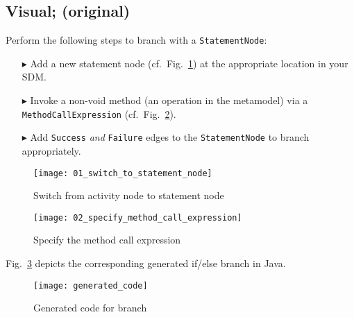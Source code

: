 \clearpage
\hypertarget{conBran vis}{}
\subsection{Visual; (original)}
\visHeader

Perform the following steps to branch with a \texttt{StatementNode}:
\begin{enumerate}
\item[$\blacktriangleright$] Add a new statement node (cf.~Fig.~\ref{fig:cond_statement_node}) at the appropriate location in your SDM.
\item[$\blacktriangleright$] Invoke a non-void method (an operation in the metamodel) via a \texttt{MethodCallExpression} (cf.~Fig.~\ref{fig:cond_method_call}).
\item[$\blacktriangleright$] Add \texttt{Success} \emph{and} \texttt{Failure} edges to the \texttt{StatementNode} to branch appropriately.
\end{enumerate}

\begin{figure}[htp]
\begin{center}
  \texttt{[image: 01\_switch\_to\_statement\_node]}
  \caption{Switch from activity node to statement node}
  \label{fig:cond_statement_node}
\end{center}
\end{figure}

\begin{figure}[htp]
\begin{center}
  \texttt{[image: 02\_specify\_method\_call\_expression]}
  \caption{Specify the method call expression}
  \label{fig:cond_method_call}
\end{center}
\end{figure}

Fig.~\ref{fig:cond_branch_on_op_code} depicts the corresponding generated if/else branch in Java.

\begin{figure}[htp]
\begin{center}
  \texttt{[image: generated\_code]}
  \caption{Generated code for branch}
  \label{fig:cond_branch_on_op_code}
\end{center}
\end{figure}
